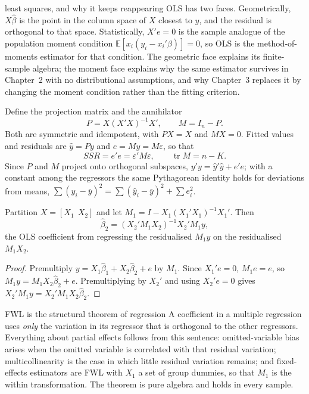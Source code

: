 \documentclass[11pt,a4paper]{article}
\newcommand{\E}{\mathbb{E}}
\newcommand{\tr}{\operatorname{tr}}
\newcommand{\bh}{\hat\beta}
\begin{document}
\begin{whybox}{least squares, and why it keeps reappearing}
OLS has two faces. Geometrically, $X\bh$ is the point in the column space of $X$ closest to $y$, and the residual is orthogonal to that space. Statistically, $X'e=0$ is the sample analogue of the population moment condition $\E[x_i(y_i-x_i'\beta)]=0$, so OLS is the method-of-moments estimator for that condition. The geometric face explains its finite-sample algebra; the moment face explains why the same estimator survives in Chapter~2 with no distributional assumptions, and why Chapter~3 replaces it by changing the moment condition rather than the fitting criterion.
\end{whybox}

Define the projection matrix and the annihilator
\[
P = X(X'X)^{-1}X', \qquad M = I_n - P .
\]
Both are symmetric and idempotent, with $PX=X$ and $MX=0$. Fitted values and residuals are $\hat y=Py$ and $e=My=M\varepsilon$, so that
\[
SSR = e'e = \varepsilon'M\varepsilon, \qquad \tr M = n-K .
\]
Since $P$ and $M$ project onto orthogonal subspaces, $y'y=\hat y'\hat y+e'e$; with a constant among the regressors the same Pythagorean identity holds for deviations from means, $\sum(y_i-\bar y)^2=\sum(\hat y_i-\bar y)^2+\sum e_i^2$.

\begin{theorem}\label{thm:fwl}
Partition $X=[X_1\;\, X_2]$ and let $M_1 = I - X_1(X_1'X_1)^{-1}X_1'$. Then
\[
\bh_2 = (X_2'M_1X_2)^{-1}X_2'M_1y,
\]
the OLS coefficient from regressing the residualised $M_1y$ on the residualised $M_1X_2$.
\end{theorem}

\begin{proof}
Premultiply $y = X_1\bh_1+X_2\bh_2+e$ by $M_1$. Since $X_1'e=0$, $M_1e=e$, so $M_1y=M_1X_2\bh_2+e$. Premultiplying by $X_2'$ and using $X_2'e=0$ gives $X_2'M_1y=X_2'M_1X_2\bh_2$.
\end{proof}

\begin{whybox}{FWL is the structural theorem of regression}
A coefficient in a multiple regression uses \emph{only} the variation in its regressor that is orthogonal to the other regressors. Everything about partial effects follows from this sentence: omitted-variable bias arises when the omitted variable is correlated with that residual variation; multicollinearity is the case in which little residual variation remains; and fixed-effects estimators are FWL with $X_1$ a set of group dummies, so that $M_1$ is the within transformation. The theorem is pure algebra and holds in every sample.
\end{whybox}
\end{document}
